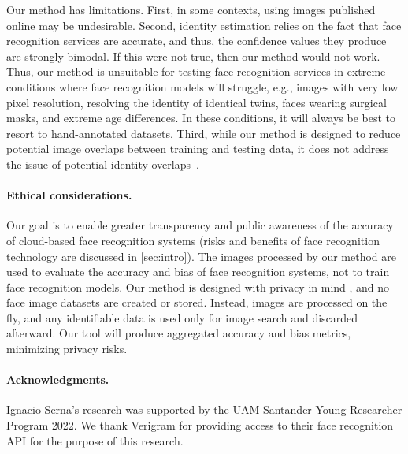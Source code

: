 \documentclass[10pt,twocolumn,letterpaper]{article}
\begin{document}
Our method has limitations. 
First, in some contexts, using images published online may be undesirable. Second, identity estimation relies on the fact that face recognition services are accurate, and thus, the confidence values they produce are strongly bimodal. If this were not true, then our method would not work. Thus, our method is unsuitable for testing face recognition services in extreme conditions where face recognition models will struggle, e.g., images with very low pixel resolution, resolving the identity of identical twins, faces wearing surgical masks, and extreme age differences. In these conditions, it will always be best to resort to hand-annotated datasets.
Third, while our method is designed to reduce potential image overlaps between training and testing data, it does not address the issue of potential identity overlaps~\cite{wu2024identity}. 

\vspace{-3mm}
\vfill
\paragraph{Ethical considerations.}
Our goal is to enable greater transparency and public awareness of the accuracy of cloud-based face recognition systems (risks and benefits of face recognition technology are discussed in \cref{sec:intro}). The images processed by our method are used to evaluate the accuracy and bias of face recognition systems, not to train face recognition models. 
Our method is designed with privacy in mind \cite{lala2023data}, and no face image datasets are created or stored. Instead, images are processed on the fly, and any identifiable data is used only for image search and discarded afterward. Our tool will produce aggregated accuracy and bias metrics, minimizing privacy risks.

\vspace{-3mm}
\vfill
\paragraph{Acknowledgments.}
Ignacio Serna's research was supported by the UAM-Santander Young Researcher Program 2022.
We thank Verigram for providing access to their face recognition API for the purpose of this research.

\newpage
{
\small


}
\end{document}
